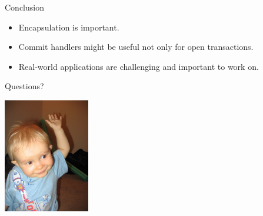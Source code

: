 \documentclass[]{beamer}
\begin{document}
\begin{frame}{Conclusion}
\begin{itemize}
\item Encapsulation is important.
\item Commit handlers might be useful not only for open transactions.
\item Real-world applications are challenging and important to work on.
\end{itemize}
\end{frame}

\begin{frame}{Questions?}
\begin{center}
\includegraphics[height=5cm]{raisehand.jpg}
\end{center}
\end{frame}
\end{document}
